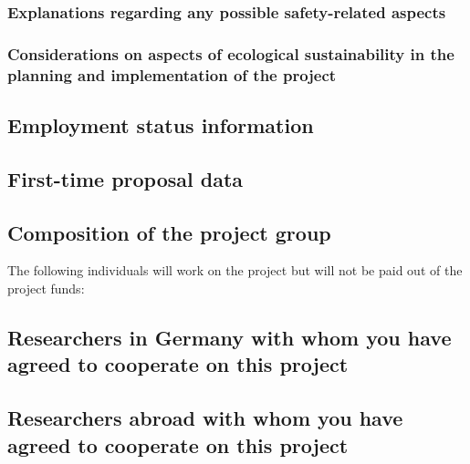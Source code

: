 \documentclass{scrartcl}
\begin{document}
\subsubsection{Explanations regarding any possible safety-related aspects}



\subsubsection{Considerations on aspects of ecological sustainability in the planning and implementation of the project}

\subsection{Employment status information}

\subsection{First-time proposal data}

\subsection{Composition of the project group}
The following individuals will work on the project but will not be paid out of
the project funds:

\subsection{Researchers in Germany with whom you have agreed to cooperate on this project}

\subsection{Researchers abroad with whom you have agreed to cooperate on this project}
\end{document}
